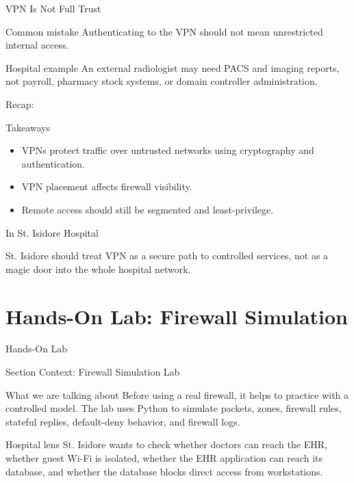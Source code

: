 \documentclass[presentation]{beamer}
\newcommand{\sectiontitleframe}[1]{
\begin{frame}[plain,c]
\begin{center}
{\usebeamerfont{title}\usebeamercolor[fg]{title}#1}
\end{center}
\end{frame}
}
\newcommand{\scenario}{St. Isidore Hospital}
\newcommand{\takeawaysframe}[2]{
\begin{frame}[c]{Recap: \insertsection}
\begin{block}{Takeaways}
#1
\end{block}
\begin{exampleblock}{In \scenario}
#2
\end{exampleblock}
\end{frame}
}
\begin{document}
\begin{frame}[c]{VPN Is Not Full Trust}
\begin{block}{Common mistake}
Authenticating to the VPN should not mean unrestricted internal access.
\end{block}

\begin{exampleblock}{Hospital example}
An external radiologist may need PACS and imaging reports, not payroll, pharmacy stock systems, or
domain controller administration.
\end{exampleblock}
\end{frame}

\takeawaysframe{
\begin{itemize}
    \item VPNs protect traffic over untrusted networks using cryptography and authentication.
    \item VPN placement affects firewall visibility.
    \item Remote access should still be segmented and least-privilege.
\end{itemize}
}{
St. Isidore should treat VPN as a secure path to controlled services, not as a magic door into the
whole hospital network.
}

\section{Hands-On Lab: Firewall Simulation}
\sectiontitleframe{Hands-On Lab}

\begin{frame}[c]{Section Context: Firewall Simulation Lab}
\begin{block}{What we are talking about}
Before using a real firewall, it helps to practice with a controlled model. The lab uses Python to
simulate packets, zones, firewall rules, stateful replies, default-deny behavior, and firewall logs.
\end{block}

\begin{exampleblock}{Hospital lens}
St. Isidore wants to check whether doctors can reach the EHR, whether guest Wi-Fi is isolated,
whether the EHR application can reach its database, and whether the database blocks direct access
from workstations.
\end{exampleblock}
\end{frame}
\end{document}

